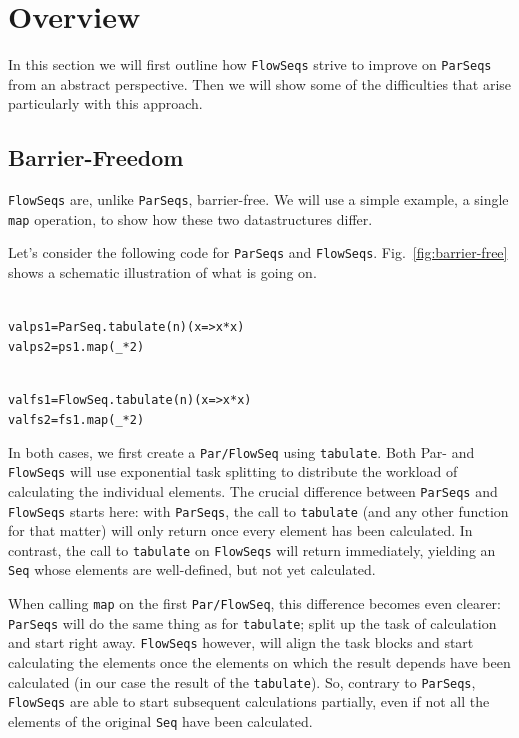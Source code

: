 \documentclass[runningheads,a4paper,fleqn]{llncs}
\begin{document}
\section{Overview}
\label{sec:overview}

In this section we will first outline how \texttt{FlowSeqs} strive to improve
on \texttt{ParSeqs} from an abstract perspective. Then we will show some of
the difficulties that arise particularly with this approach.

\subsection{Barrier-Freedom}
\texttt{FlowSeqs} are, unlike \texttt{ParSeqs}, barrier-free. We will use a simple
example, a single \texttt{map} operation, to show how these two
datastructures differ.

Let's consider the following code for \texttt{ParSeqs} and
\texttt{FlowSeqs}. Fig.~\ref{fig:barrier-free} shows a schematic
illustration of what is going on.

\noindent
\begin{minipage}[t]{.5\textwidth}
\begin{alltt}
{\scriptsize
val ps1 = ParSeq.tabulate(n)(x => x*x)
val ps2 = ps1.map(_ * 2)
}
\end{alltt}
\end{minipage}
\begin{minipage}[t]{.5\textwidth}
\begin{alltt}
{\scriptsize
val fs1 = FlowSeq.tabulate(n)(x => x*x)
val fs2 = fs1.map(_ * 2)
}
\end{alltt}
\end{minipage}

In both cases, we first create a \texttt{Par/FlowSeq} using
\texttt{tabulate}. Both Par- and \texttt{FlowSeqs} will use exponential task
splitting \cite{collect11,cong08} to distribute the workload of
calculating the individual elements. The crucial difference between
\texttt{ParSeqs} and \texttt{FlowSeqs} starts here: with \texttt{ParSeqs}, the call to
\texttt{tabulate} (and any other function for that matter) will only
return once every element has been calculated. In contrast, the call
to \texttt{tabulate} on \texttt{FlowSeqs} will return immediately, yielding
an \texttt{Seq} whose elements are well-defined, but not yet calculated.

When calling \texttt{map} on the first \texttt{Par/FlowSeq}, this difference
becomes even clearer: \texttt{ParSeqs} will do the same thing as for
\texttt{tabulate}; split up the task of calculation and start right
away. \texttt{FlowSeqs} however, will align the task blocks and start
calculating the elements once the elements on which the result depends have
been calculated (in our case the result of the \texttt{tabulate}). So,
contrary to \texttt{ParSeqs}, \texttt{FlowSeqs} are able to start subsequent
calculations partially, even if not all the elements of the original
\texttt{Seq} have been calculated.
\end{document}
